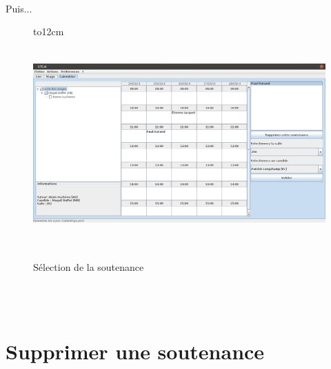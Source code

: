 \documentclass[a4paper,10pt]{report}
\begin{document}
      \paragraph{}
      Puis...
      
	 \begin{figure}[H]
	   \hbox to12cm{\hss\includegraphics[height=8cm,width=18cm]{../general/soutenance.png}\hss}
	   \caption{Sélection de la soutenance}
	 \end{figure}
      
      
      ~\\~\\
    \section{Supprimer une soutenance}
\end{document}
